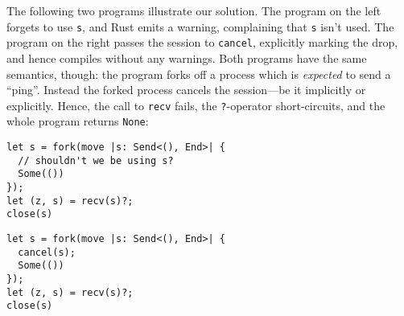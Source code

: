 \documentclass[copyright,creativecommons]{eptcs}
\begin{document}
The following two programs illustrate our solution. The program on the left forgets to use \lstinline{s}, and Rust emits a warning, complaining that \lstinline{s} isn't used. The program on the right passes the session to \lstinline{cancel}, explicitly marking the drop, and hence compiles without any warnings. Both programs have the same semantics, though: the program forks off a process which is \emph{expected} to send a ``ping''. Instead the forked process cancels the session---be it implicitly or explicitly. Hence, the call to \lstinline{recv} fails, the \lstinline{?}-operator short-circuits, and the whole program returns \lstinline{None}:

\vspace{-0.5\baselineskip}
\begin{minipage}[t]{0.5\linewidth}
\begin{lstlisting}
let s = fork(move |s: Send<(), End>| {
  // shouldn't we be using s?
  Some(())
});
let (z, s) = recv(s)?;
close(s)
\end{lstlisting}
\end{minipage}%
\begin{minipage}[t]{0.5\linewidth}
\begin{lstlisting}
let s = fork(move |s: Send<(), End>| {
  cancel(s);
  Some(())
});
let (z, s) = recv(s)?;
close(s)
\end{lstlisting}
\end{minipage}
\vspace{-0.25\baselineskip}
\end{document}
